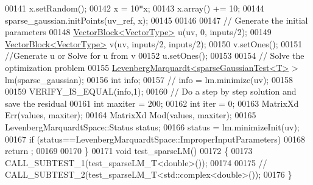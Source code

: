 \begin{DoxyCode}
00141   x.setRandom();
00142   x = 10*x;
00143   x.array() += 10;
00144   sparse\_gaussian.initPoints(uv\_ref, x);
00145   
00146   
00147   \textcolor{comment}{// Generate the initial parameters }
00148   \hyperlink{group___core___module_class_eigen_1_1_vector_block}{VectorBlock<VectorType>} u(uv, 0, inputs/2); 
00149   \hyperlink{group___core___module_class_eigen_1_1_vector_block}{VectorBlock<VectorType>} v(uv, inputs/2, inputs/2);
00150   v.setOnes();
00151   \textcolor{comment}{//Generate u or Solve for u from v}
00152   u.setOnes();
00153   
00154   \textcolor{comment}{// Solve the optimization problem}
00155   \hyperlink{class_eigen_1_1_levenberg_marquardt}{LevenbergMarquardt<sparseGaussianTest<T>} > lm(sparse\_gaussian);
00156   \textcolor{keywordtype}{int} info;
00157 \textcolor{comment}{//   info = lm.minimize(uv);}
00158   
00159   VERIFY\_IS\_EQUAL(info,1);
00160     \textcolor{comment}{// Do a step by step solution and save the residual }
00161   \textcolor{keywordtype}{int} maxiter = 200;
00162   \textcolor{keywordtype}{int} iter = 0;
00163   MatrixXd Err(values, maxiter);
00164   MatrixXd Mod(values, maxiter);
00165   LevenbergMarquardtSpace::Status status; 
00166   status = lm.minimizeInit(uv);
00167   \textcolor{keywordflow}{if} (status==LevenbergMarquardtSpace::ImproperInputParameters)
00168       return ;
00169 
00170 \}
00171 \textcolor{keywordtype}{void} test\_sparseLM()
00172 \{
00173   CALL\_SUBTEST\_1(test\_sparseLM\_T<double>());
00174   
00175   \textcolor{comment}{// CALL\_SUBTEST\_2(test\_sparseLM\_T<std::complex<double>());}
00176 \}
\end{DoxyCode}
